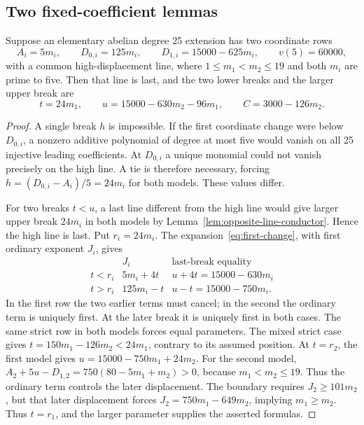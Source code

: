 \subsection{Two fixed-coefficient lemmas}
\begin{lemma}\label{lem:common-high-numbers}
Suppose an elementary abelian degree 25 extension has two coordinate rows
\[
 A_i=5m_i,\qquad D_{0,i}=125m_i,\qquad
 D_{1,i}=15000-625m_i,\qquad v(5)=60000,
\]
with a common high-displacement line, where $1\le m_1<m_2\le19$ and both $m_i$ are prime to five. Then that line is last, and the two lower breaks and the larger upper break are
\[
 t=24m_1,\qquad u=15000-630m_2-96m_1,
 \qquad C=3000-126m_2.
\]
\end{lemma}
\begin{proof}
A single break $h$ is impossible. If the first coordinate change were below $D_{0,i}$, a nonzero additive polynomial of degree at most five would vanish on all 25 injective leading coefficients. At $D_{0,i}$ a unique monomial could not vanish precisely on the high line. A tie is therefore necessary, forcing $h=(D_{0,i}-A_i)/5=24m_i$ for both models. These values differ.

For two breaks $t<u$, a last line different from the high line would give larger upper break $24m_i$ in both models by Lemma~\ref{lem:opposite-line-conductor}. Hence the high line is last. Put $r_i=24m_i$. The expansion~\eqref{eq:first-change}, with first ordinary exponent $J_i$, gives
\[
\begin{array}{c|c|c}
 &J_i&\text{last-break equality}\\\hline
 t<r_i&5m_i+4t&u+4t=15000-630m_i\\
 t>r_i&125m_i-t&u-t=15000-750m_i.
\end{array}
\]
In the first row the two earlier terms must cancel; in the second the ordinary term is uniquely first. At the later break it is uniquely first in both cases. The same strict row in both models forces equal parameters. The mixed strict case gives $t=150m_1-126m_2<24m_1$, contrary to its assumed position. At $t=r_2$, the first model gives $u=15000-750m_1+24m_2$. For the second model, $A_2+5u-D_{1,2}=750(80-5m_1+m_2)>0$, because $m_1<m_2\le19$. Thus the ordinary term controls the later displacement. The boundary requires $J_2\ge101m_2$, but that later displacement forces $J_2=750m_1-649m_2$, implying $m_1\ge m_2$. Thus $t=r_1$, and the larger parameter supplies the asserted formulas.
\end{proof}

